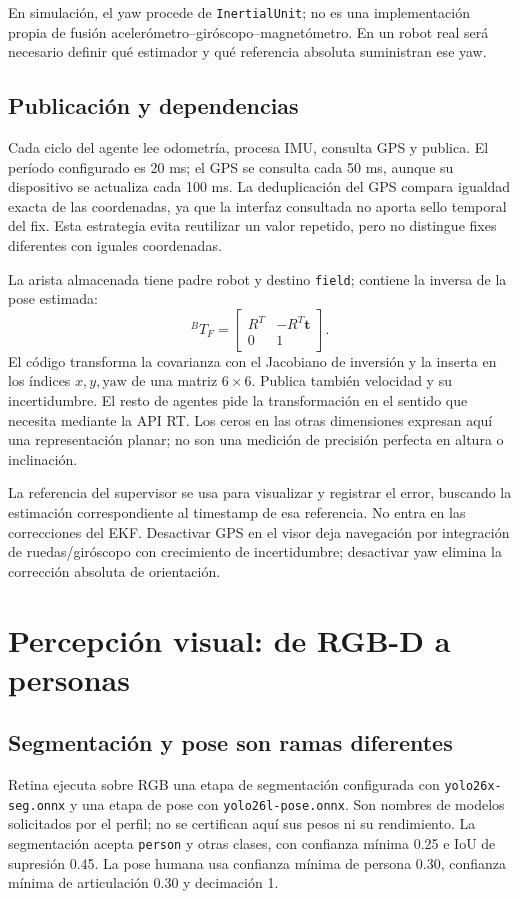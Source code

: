 \documentclass[11pt,a4paper]{article}
\newcommand{\code}[1]{\nolinkurl{#1}}
\newcommand{\trans}[2]{{}^{#1}\!T_{#2}}
\begin{document}
En simulación, el yaw procede de \code{InertialUnit}; no es una implementación propia
de fusión acelerómetro--giróscopo--magnetómetro. En un robot real será necesario
definir qué estimador y qué referencia absoluta suministran ese yaw.~\cite{bridgeimu}

\subsection{Publicación y dependencias}
Cada ciclo del agente lee odometría, procesa IMU, consulta GPS y publica. El período
configurado es 20 ms; el GPS se consulta cada 50 ms, aunque su dispositivo se
actualiza cada 100 ms. La deduplicación del GPS compara igualdad exacta de las
coordenadas, ya que la interfaz consultada no aporta sello temporal del fix. Esta
estrategia evita reutilizar un valor repetido, pero no distingue fixes diferentes
con iguales coordenadas.~\cite{openworker,openconfig}

La arista almacenada tiene padre robot y destino \code{field}; contiene la inversa
de la pose estimada:
\begin{equation}
 \trans{B}{F}=\begin{bmatrix}R^T&-R^T\bm{t}\\0&1\end{bmatrix}.
\end{equation}
El código transforma la covarianza con el Jacobiano de inversión y la inserta en
los índices $x,y,\mathrm{yaw}$ de una matriz $6\times6$. Publica también velocidad
y su incertidumbre. El resto de agentes pide la transformación en el sentido que
necesita mediante la API RT. Los ceros en las otras dimensiones expresan aquí una
representación planar; no son una medición de precisión perfecta en altura o
inclinación.~\cite{opengraph}

La referencia del supervisor se usa para visualizar y registrar el error, buscando
la estimación correspondiente al timestamp de esa referencia. No entra en las
correcciones del EKF. Desactivar GPS en el visor deja navegación por integración de
ruedas/giróscopo con crecimiento de incertidumbre; desactivar yaw elimina la
corrección absoluta de orientación.~\cite{openworker,robotworker}

\section{Percepción visual: de RGB-D a personas}

\subsection{Segmentación y pose son ramas diferentes}
Retina ejecuta sobre RGB una etapa de segmentación configurada con
\code{yolo26x-seg.onnx} y una etapa de pose con \code{yolo26l-pose.onnx}. Son nombres
de modelos solicitados por el perfil; no se certifican aquí sus pesos ni su
rendimiento. La segmentación acepta \code{person} y otras clases, con confianza
mínima 0.25 e IoU de supresión 0.45. La pose humana usa confianza mínima de persona
0.30, confianza mínima de articulación 0.30 y decimación 1.~\cite{retinaconfig,retinaworker}
\end{document}
